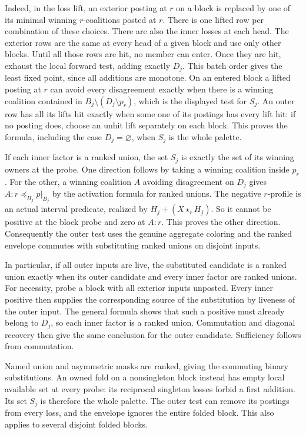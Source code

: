 Indeed, in the loss lift, an exterior posting at $r$ on a block
is replaced by one of its minimal winning $r$-coalitions posted
at $r$. There is one lifted row per combination of these choices.
There are also the inner losses at each head. The exterior rows
are the same at every head of a given block and use only other
blocks. Until all those rows are hit, no member can enter. Once
they are hit, exhaust the local forward test, adding exactly
$D_j$. This batch order gives the least fixed point, since all
additions are monotone. On an entered block a lifted posting
at $r$ can avoid every disagreement exactly when there is a
winning coalition contained in $B_j\setminus(D_j\setminus p_r)$,
which is the displayed test for $S_j$. An outer row has all
its lifts hit exactly when some one of its postings has every
lift hit: if no posting does, choose an unhit lift separately
on each block. This proves the formula, including the case
$D_j=\varnothing$, when $S_j$ is the whole palette.

If each inner factor is a ranked union, the set $S_j$ is
exactly the set of its winning owners at the probe. One
direction follows by taking a winning coalition inside $p_r$.
For the other, a winning coalition $A$ avoiding disagreement
on $D_j$ gives $A:r\preceq_{H_j}p|_{B_j}$ by the activation
formula for ranked unions. The negative $r$-profile is an
actual interval predicate, realized by
$H_j+(X\star_r H_j)$. So it cannot be positive at the block
probe and zero at $A:r$. This proves the other direction.
Consequently the outer test uses the genuine aggregate
coloring and the ranked envelope commutes with substituting
ranked unions on disjoint inputs.

In particular, if all outer inputs are live, the substituted
candidate is a ranked union exactly when its outer candidate
and every inner factor are ranked unions. For necessity,
probe a block with all exterior inputs unposted. Every
inner positive then supplies the corresponding source of
the substitution by liveness of the outer input. The general
formula shows that such a positive must already belong to
$D_j$, so each inner factor is a ranked union. Commutation
and diagonal recovery then give the same conclusion for the
outer candidate. Sufficiency follows from commutation.

Named union and asymmetric masks are ranked, giving the
commuting binary substitutions. An owned fold on a
nonsingleton block instead has empty local available set
at every probe: its reciprocal singleton losses forbid a
first addition. Its set $S_j$ is therefore the whole palette.
The outer test can remove its postings from every loss,
and the envelope ignores the entire folded block. This
also applies to several disjoint folded blocks.

